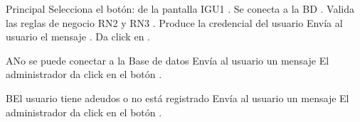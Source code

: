 	\begin{UCtrayectoria}{Principal}
	\UCpaso[\UCactor] Selecciona el botón:   de la pantalla IGU1 .	
		\UCpaso[\UCsist] Se conecta a la BD .
		\UCpaso[\UCsist] Valida las reglas de negocio RN2 y RN3 .
		\UCpaso[\UCsist] Produce la credencial del usuario
		\UCpaso[\UCsist] Envía al usuario el mensaje .
		\UCpaso[\UCactor]Da click en .

		\end{UCtrayectoria}		
		\begin{UCtrayectoriaA}{A}{No se puede conectar a la Base de datos}
			\UCpaso[\UCsist] Envía al usuario un mensaje 
			\UCpaso[\UCsist] El administrador da click en el botón .
		\end{UCtrayectoriaA}
		
		\begin{UCtrayectoriaA}{B}{El usuario tiene adeudos o no está registrado}
			\UCpaso[\UCsist] Envía al usuario un mensaje 
			\UCpaso[\UCsist] El administrador da click en el botón .
		\end{UCtrayectoriaA}
		


